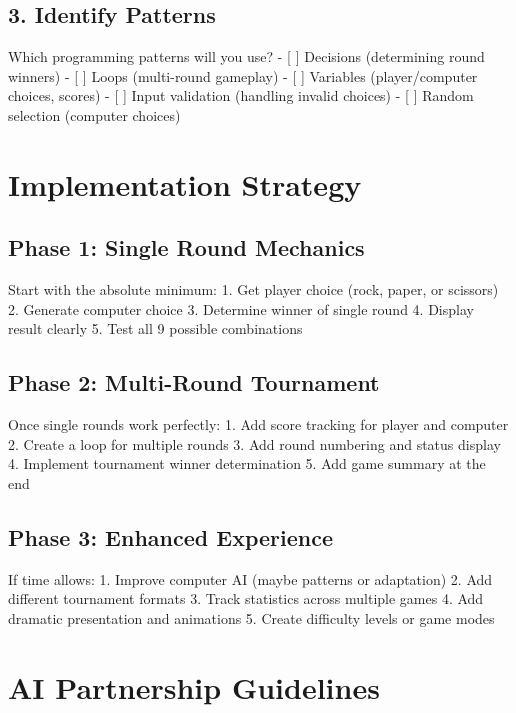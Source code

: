 \documentclass[
  letterpaper,
  DIV=11,
  numbers=noendperiod,
  oneside]{scrreprt}
\begin{document}
\subsection{3. Identify Patterns}\label{identify-patterns-3}

Which programming patterns will you use? - {[} {]} Decisions
(determining round winners) - {[} {]} Loops (multi-round gameplay) - {[}
{]} Variables (player/computer choices, scores) - {[} {]} Input
validation (handling invalid choices) - {[} {]} Random selection
(computer choices)

\section{Implementation Strategy}\label{implementation-strategy-3}

\subsection{Phase 1: Single Round
Mechanics}\label{phase-1-single-round-mechanics}

Start with the absolute minimum: 1. Get player choice (rock, paper, or
scissors) 2. Generate computer choice 3. Determine winner of single
round 4. Display result clearly 5. Test all 9 possible combinations

\subsection{Phase 2: Multi-Round
Tournament}\label{phase-2-multi-round-tournament}

Once single rounds work perfectly: 1. Add score tracking for player and
computer 2. Create a loop for multiple rounds 3. Add round numbering and
status display 4. Implement tournament winner determination 5. Add game
summary at the end

\subsection{Phase 3: Enhanced
Experience}\label{phase-3-enhanced-experience-1}

If time allows: 1. Improve computer AI (maybe patterns or adaptation) 2.
Add different tournament formats 3. Track statistics across multiple
games 4. Add dramatic presentation and animations 5. Create difficulty
levels or game modes

\section{AI Partnership Guidelines}\label{ai-partnership-guidelines-3}
\end{document}
